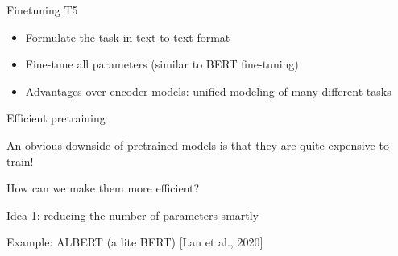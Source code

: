 \documentclass[usenames,dvipsnames,notes,11pt,aspectratio=169,hyperref={colorlinks=true, linkcolor=blue}]{beamer}
\begin{document}
\begin{frame}
    {Finetuning T5}
    \begin{itemize}
        \item Formulate the task in text-to-text format
        \item Fine-tune all parameters (similar to BERT fine-tuning)
        \item Advantages over encoder models: unified modeling of many different tasks 
    \end{itemize}
\end{frame}

\begin{frame}
    {Efficient pretraining}

    An obvious downside of pretrained models is that they are quite expensive to train!

    How can we make them more efficient?\pause

    Idea 1: reducing the number of parameters smartly

    Example: ALBERT (a lite BERT) [Lan et al., 2020]

    \begin{itemize}
    \end{itemize}
\end{frame}
\end{document}
